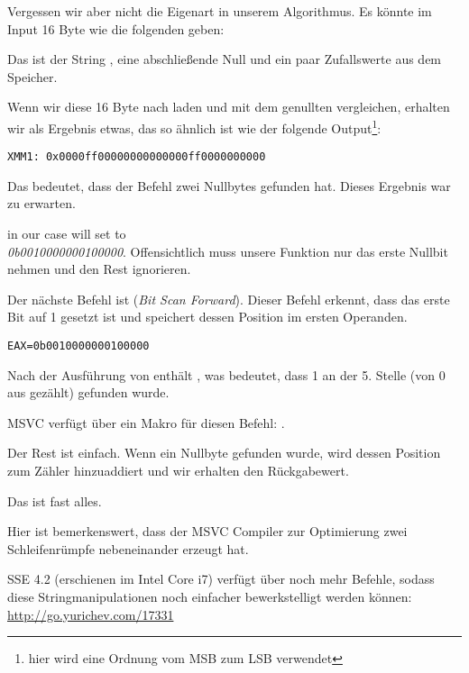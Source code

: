Vergessen wir aber nicht die Eigenart in unserem Algorithmus. Es könnte im Input 16 Byte wie die folgenden geben:


Das ist der String , eine abschließende Null und ein paar Zufallswerte aus dem Speicher.

Wenn wir diese 16 Byte nach  laden und mit dem genullten  vergleichen, erhalten wir als Ergebnis etwas,
das so ähnlich ist wie der folgende Output\footnote{hier wird eine Ordnung vom \ac{MSB} zum \ac{LSB} verwendet}:

\begin{verbatim}
XMM1: 0x0000ff00000000000000ff0000000000
\end{verbatim}

Das bedeutet, dass der Befehl zwei Nullbytes gefunden hat. Dieses Ergebnis war zu erwarten.
 
 in our case will set \EAX to\\
\emph{0b0010000000100000}.
Offensichtlich muss unsere Funktion nur das erste Nullbit nehmen und den Rest ignorieren.

\label{instruction_BSF}
Der nächste Befehl ist  (\emph{Bit Scan Forward}). 
Dieser Befehl erkennt, dass das erste Bit auf 1 gesetzt ist und speichert dessen Position im ersten Operanden.

\begin{verbatim}
EAX=0b0010000000100000
\end{verbatim}
Nach der Ausführung von  enthält , was bedeutet, dass 1 an der 5. Stelle (von 0 aus gezählt)
gefunden wurde.

MSVC verfügt über ein Makro für diesen Befehl: .

Der Rest ist einfach. Wenn ein Nullbyte gefunden wurde, wird dessen Position zum Zähler hinzuaddiert und wir erhalten
den Rückgabewert.

Das ist fast alles.

Hier ist bemerkenswert, dass der MSVC Compiler zur Optimierung zwei Schleifenrümpfe nebeneinander erzeugt hat.

SSE 4.2 (erschienen im Intel Core i7) verfügt über noch mehr Befehle, sodass diese Stringmanipulationen noch einfacher
bewerkstelligt werden können: \url{http://go.yurichev.com/17331}
